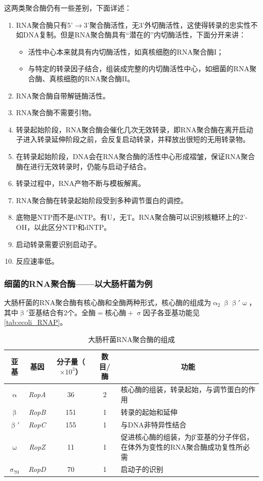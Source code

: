这两类聚合酶仍有一些差别，下面详述：
\begin{enumerate}
	\item RNA聚合酶只有5'$\longrightarrow$3'聚合酶活性，无3'外切酶活性，这使得转录的忠实性不如DNA复制。但是RNA聚合酶具有“潜在的”内切酶活性，下面分开来讲：
	\begin{itemize}
		\item 活性中心本来就具有内切酶活性，如真核细胞的RNA聚合酶I；
		\item 与特定的转录因子结合，组装成完整的内切酶活性中心，如细菌的RNA聚合酶、真核细胞的RNA聚合酶II。
	\end{itemize}
	\item RNA聚合酶自带解链酶活性。
	\item RNA聚合酶不需要引物。
	\item 转录起始阶段，RNA聚合酶会催化几次无效转录，即RNA聚合酶在离开启动子进入转录延伸阶段之前，会反复启动转录，并释放出很短的无用转录物。
	\item 在转录起始阶段，DNA会在RNA聚合酶的活性中心形成褶皱，保证RNA聚合酶在进行无效转录时，仍能与启动子结合。
	\item 转录过程中，RNA产物不断与模板解离。
	\item RNA聚合酶在转录起始阶段受到多种调节蛋白的调控。
	\item 底物是NTP而不是dNTP。有U，无T。RNA聚合酶可以识别核糖环上的2'-OH，以此区分NTP和dNTP。
	\item 启动转录需要识别启动子。
	\item 反应速率低。
\end{enumerate}

\subsubsection{细菌的RNA聚合酶——以大肠杆菌为例}

大肠杆菌的RNA聚合酶有核心酶和全酶两种形式，核心酶的组成为$\upalpha_2\upbeta\upbeta'\upomega$，其中$\upbeta'$亚基结合有2个。$\text{全酶}=\text{核心酶} + \upsigma\text{因子}$各亚基功能见\autoref{tab:ecoli_RNAP}。

\begin{table}[h]
	\centering
	\begin{tabular}{|c|c|c|c|m{15em}|}
		\hline
		\textbf{亚基} & \textbf{基因} & \textbf{分子量（$\displaystyle\times 10^{3}$）} & 数目/酶 & \multicolumn{1}{c|}{\textbf{功能}} \\ \hline
		$\upalpha$ & \textit{RopA} & 36 & 2 & 核心酶的组装，转录起始，与调节蛋白的作用 \\ \hline
		$\upbeta$ & \textit{RopB} & 151 & 1 & 转录的起始和延伸 \\ \hline
		$\upbeta'$ & \textit{RopC} & 155 & 1 & 与DNA非特异性结合 \\ \hline
		$\upomega$ & \textit{RopZ} & 11 & 1 & 促进核心酶的组装，为β′亚基的分子伴侣，在体外为变性的RNA聚合酶成功复性所必需 \\ \hline
		$\upsigma_{70}$ & \textit{RopD} & 70 & 1 & 启动子的识别 \\ \hline
	\end{tabular}
	\caption{大肠杆菌RNA聚合酶的组成}
	\label{tab:ecoli_RNAP}
\end{table}

